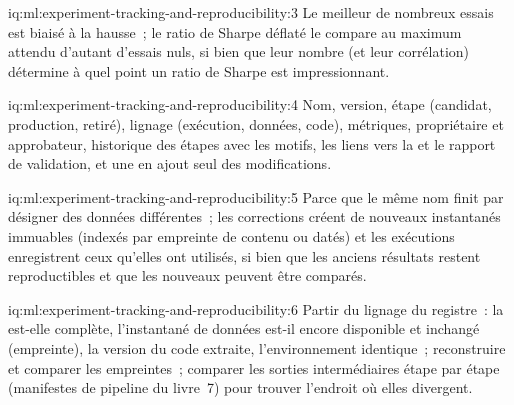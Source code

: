 \begin{solution}{iq:ml:experiment-tracking-and-reproducibility:3}
Le meilleur de nombreux essais est biaisé à la hausse~; le ratio de Sharpe déflaté le compare au maximum attendu d'autant d'essais
nuls, si bien que leur nombre (et leur corrélation) détermine à quel point un ratio de Sharpe est impressionnant.
\end{solution}

\begin{solution}{iq:ml:experiment-tracking-and-reproducibility:4}
Nom, version, étape (candidat, production, retiré), lignage (exécution, données, code), métriques, propriétaire et approbateur, historique des étapes avec
les motifs, les liens vers la  et le rapport de validation, et une  en ajout seul des modifications.
\end{solution}

\begin{solution}{iq:ml:experiment-tracking-and-reproducibility:5}
Parce que le même nom finit par désigner des données différentes~; les corrections créent de nouveaux instantanés immuables (indexés par empreinte de contenu ou datés) et les exécutions
enregistrent ceux qu'elles ont utilisés, si bien que les anciens résultats restent reproductibles et que les nouveaux peuvent être comparés.
\end{solution}

\begin{solution}{iq:ml:experiment-tracking-and-reproducibility:6}
Partir du lignage du registre~: la  est-elle complète, l'instantané de données est-il encore disponible et inchangé (empreinte), la
version du code extraite, l'environnement identique~; reconstruire et comparer les empreintes~; comparer les sorties intermédiaires étape par étape (manifestes de pipeline
du livre~7) pour trouver l'endroit où elles divergent.
\end{solution}
